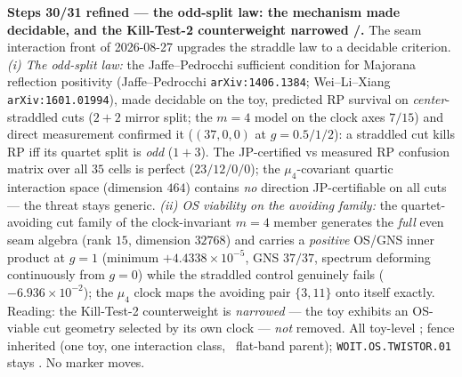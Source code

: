 \par\smallskip\noindent\textbf{Steps 30/31 refined --- the odd-split law: the mechanism made
decidable, and the Kill-Test-2 counterweight narrowed \mE/\mC.} The seam interaction front of
2026-08-27 upgrades the straddle law to a decidable criterion. \emph{(i) The odd-split law:}
the Jaffe--Pedrocchi sufficient condition for Majorana reflection positivity
(Jaffe--Pedrocchi \texttt{arXiv:1406.1384}; Wei--Li--Xiang \texttt{arXiv:1601.01994}), made
decidable on the toy, predicted RP survival on \emph{center}-straddled cuts ($2{+}2$ mirror
split; the $m=4$ model on the clock axes $7/15$) and direct measurement confirmed it
($(37,0,0)$ at $g=0.5/1/2$): a straddled cut kills RP iff its quartet split is \emph{odd}
($1{+}3$). The JP-certified vs measured RP confusion matrix over all $35$ cells is perfect
($23/12/0/0$); the $\mu_4$-covariant quartic interaction space (dimension $464$) contains
\emph{no} direction JP-certifiable on all cuts --- the threat stays generic. \emph{(ii) OS
viability on the avoiding family:} the quartet-avoiding cut family of the clock-invariant
$m=4$ member generates the \emph{full} even seam algebra (rank $15$, dimension $32768$) and
carries a \emph{positive} OS/GNS inner product at $g=1$ (minimum $+4.4338\times10^{-5}$, GNS
$37/37$, spectrum deforming continuously from $g=0$) while the straddled control genuinely
fails ($-6.936\times10^{-2}$); the $\mu_4$ clock maps the avoiding pair $\{3,11\}$ onto itself
exactly. Reading: the Kill-Test-2 counterweight is \emph{narrowed} --- the toy exhibits an
OS-viable cut geometry selected by its own clock --- \emph{not} removed. All toy-level \mE;
fence inherited (one toy, one interaction class, \mC\ flat-band parent);
\texttt{WOIT.OS.TWISTOR.01} stays \mO. No marker moves.

